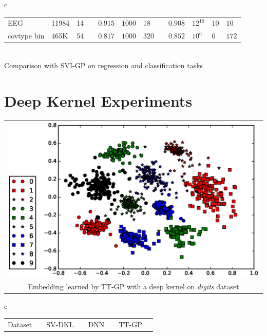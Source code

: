 \documentclass[a0,portrait]{a0poster}
\begin{document}
\begin{multicols}{2}
\begin{tabular}{c}
\begin{tabular}{lll l cll l clll}
    EEG & 11984 & 14 &&
    $\mathbf{0.915}$ & $1000$ & $18$ &&
    $0.908$ & $12^{10}$ & $10$ & $10$\\

    covtype bin & 465K & 54 &&
    $0.817$ & $1000$ & $320$ &&
    $\mathbf{0.852}$ & $10^6$ & $6$ & $172$\\
    \bottomrule
  \end{tabular}\\
Comparison with SVI-GP \citep{hensman2013} on regression and classification
tasks
\end{tabular}
\section*{\LARGE \color{NavyBlue} Deep Kernel Experiments}
    
\begin{center}
\begin{tabular}{c}
    \includegraphics[width=20cm]{pics/embed/embedding_2.eps}
    \\
  Embedding learned by TT-GP with a deep kernel on {\it digits}
  dataset
\end{tabular}
\end{center}

\vspace{0.5cm}

\begin{center}
\begin{tabular}{c}
    \begin{tabular}{lll ll llll lll}
      \toprule
      \multicolumn{2}{c}{Dataset}  && SV-DKL &&
      \multicolumn{2}{c}{DNN} &&
      \multicolumn{3}{c}{TT-GP}\\


\end{tabular}
\end{tabular}
\end{center}
\end{multicols}
\end{document}

